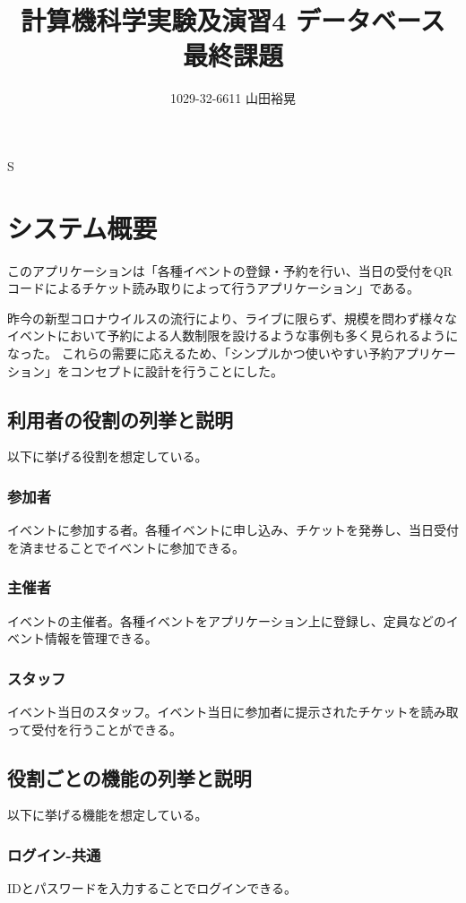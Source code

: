 \documentclass[dvipdfmx]{jarticle}
\begin{document}
\title{計算機科学実験及演習4 データベース 最終課題}S
\author{1029-32-6611 山田裕晃}
\maketitle

\section{システム概要}

このアプリケーションは「各種イベントの登録・予約を行い、当日の受付をQRコードによるチケット読み取りによって行うアプリケーション」である。

昨今の新型コロナウイルスの流行により、ライブに限らず、規模を問わず様々なイベントにおいて予約による人数制限を設けるような事例も多く見られるようになった。
これらの需要に応えるため、「シンプルかつ使いやすい予約アプリケーション」をコンセプトに設計を行うことにした。

\subsection{利用者の役割の列挙と説明}
以下に挙げる役割を想定している。
\subsubsection{参加者}
イベントに参加する者。各種イベントに申し込み、チケットを発券し、当日受付を済ませることでイベントに参加できる。
\subsubsection{主催者}
イベントの主催者。各種イベントをアプリケーション上に登録し、定員などのイベント情報を管理できる。
\subsubsection{スタッフ}
イベント当日のスタッフ。イベント当日に参加者に提示されたチケットを読み取って受付を行うことができる。

\subsection{役割ごとの機能の列挙と説明}
以下に挙げる機能を想定している。
\subsubsection{ログイン-共通}
IDとパスワードを入力することでログインできる。
\end{document}
